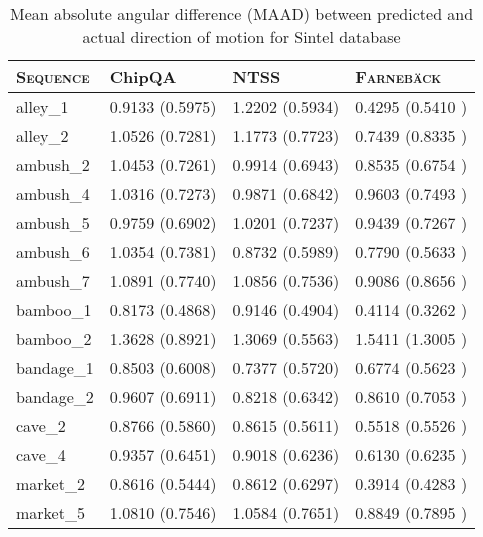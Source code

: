 \documentclass[journal]{IEEEtran}
\begin{document}
\begin{table}
\caption{Mean absolute angular difference (MAAD) between predicted and actual direction of motion  for Sintel database}
\begin{center}
\begin{tabular}{|l|l|l|l|}
\hline
\textsc{Sequence} & ChipQA & \textsc{NTSS} & \textsc{Farneb\"{a}ck}\\
\hline
alley\_1 & 0.9133 \scriptsize(0.5975) & 1.2202 \scriptsize(0.5934) & 0.4295 \scriptsize(0.5410 )\\
\hline
alley\_2 & 1.0526 \scriptsize(0.7281)& 1.1773 \scriptsize(0.7723) & 0.7439 \scriptsize(0.8335 ) \\
\hline
ambush\_2 & 1.0453 \scriptsize(0.7261)& 0.9914 \scriptsize(0.6943)& 0.8535 \scriptsize(0.6754 ) \\
\hline
ambush\_4 & 1.0316 \scriptsize(0.7273) & 0.9871 \scriptsize(0.6842) & 0.9603 \scriptsize(0.7493 )\\
\hline
ambush\_5 & 0.9759 \scriptsize(0.6902)& 1.0201 \scriptsize(0.7237)& 0.9439 \scriptsize(0.7267 ) \\
\hline
ambush\_6 & 1.0354 \scriptsize(0.7381)& 0.8732 \scriptsize(0.5989)& 0.7790 \scriptsize(0.5633 ) \\
\hline
ambush\_7 & 1.0891 \scriptsize(0.7740) & 1.0856 \scriptsize(0.7536)& 0.9086 \scriptsize(0.8656 )\\
\hline
bamboo\_1 & 0.8173 \scriptsize(0.4868)& 0.9146 \scriptsize(0.4904) & 0.4114 \scriptsize(0.3262 )\\
\hline
bamboo\_2 & 1.3628 \scriptsize(0.8921)& 1.3069 \scriptsize(0.5563)& 1.5411 \scriptsize(1.3005 ) \\
\hline
bandage\_1 & 0.8503 \scriptsize(0.6008)& 0.7377 \scriptsize(0.5720)& 0.6774 \scriptsize(0.5623 ) \\
\hline
bandage\_2 & 0.9607 \scriptsize(0.6911)& 0.8218 \scriptsize(0.6342) & 0.8610 \scriptsize(0.7053 )\\
\hline
cave\_2 & 0.8766 \scriptsize(0.5860)& 0.8615 \scriptsize(0.5611) & 0.5518 \scriptsize(0.5526 )\\
\hline
cave\_4 & 0.9357 \scriptsize(0.6451) & 0.9018 \scriptsize(0.6236)& 0.6130 \scriptsize(0.6235 )\\
\hline
market\_2 & 0.8616 \scriptsize(0.5444)& 0.8612 \scriptsize(0.6297)& 0.3914 \scriptsize(0.4283 ) \\
\hline
market\_5 & 1.0810 \scriptsize(0.7546) & 1.0584 \scriptsize(0.7651)& 0.8849 \scriptsize(0.7895 )\\

\end{tabular}
\end{center}
\end{table}
\end{document}
